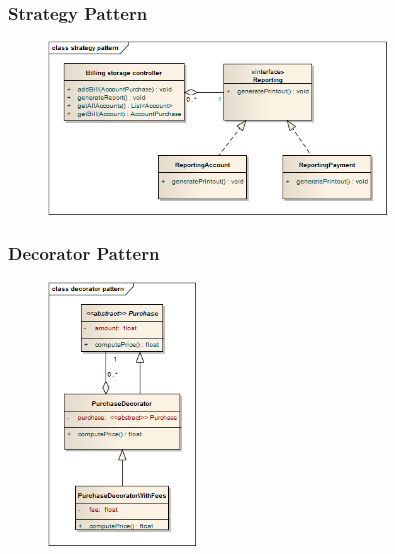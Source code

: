 

\subsubsection{Strategy Pattern}
\begin{figure}[H]
 \centering
 \includegraphics[width=0.8\textwidth]{../strategyPattern.png}
\end{figure}




\subsubsection{Decorator Pattern}
\begin{figure}[H]
 \centering
 \includegraphics[width=0.35\textwidth]{../decoratorPattern.png}
\end{figure}




